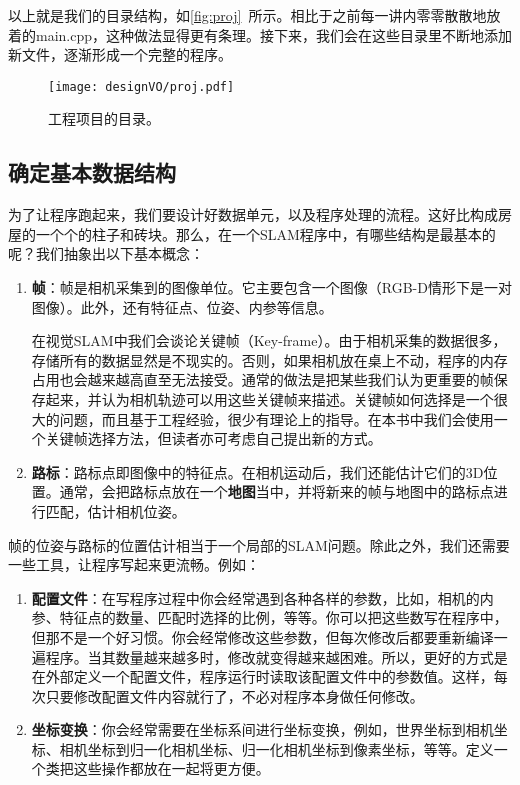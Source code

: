 以上就是我们的目录结构，如\autoref{fig:proj}~所示。相比于之前每一讲内零零散散地放着的main.cpp，这种做法显得更有条理。接下来，我们会在这些目录里不断地添加新文件，逐渐形成一个完整的程序。

\begin{figure}[!htp]
	\centering
	\texttt{[image: designVO/proj.pdf]}
	\caption{工程项目的目录。}
	\label{fig:proj}
\end{figure}

\subsection{确定基本数据结构}
为了让程序跑起来，我们要设计好数据单元，以及程序处理的流程。这好比构成房屋的一个个的柱子和砖块。那么，在一个SLAM程序中，有哪些结构是最基本的呢？我们抽象出以下基本概念：

\begin{enumerate}
	\item \textbf{帧}：帧是相机采集到的图像单位。它主要包含一个图像（RGB-D情形下是一对图像）。此外，还有特征点、位姿、内参等信息。
	
	在视觉SLAM中我们会谈论关键帧（Key-frame）。由于相机采集的数据很多，存储所有的数据显然是不现实的。否则，如果相机放在桌上不动，程序的内存占用也会越来越高直至无法接受。通常的做法是把某些我们认为更重要的帧保存起来，并认为相机轨迹可以用这些关键帧来描述。关键帧如何选择是一个很大的问题，而且基于工程经验，很少有理论上的指导。在本书中我们会使用一个关键帧选择方法，但读者亦可考虑自己提出新的方式。
	
	\item \textbf{路标}：路标点即图像中的特征点。在相机运动后，我们还能估计它们的3D位置。通常，会把路标点放在一个\textbf{地图}当中，并将新来的帧与地图中的路标点进行匹配，估计相机位姿。
\end{enumerate}

\clearpage
帧的位姿与路标的位置估计相当于一个局部的SLAM问题。除此之外，我们还需要一些工具，让程序写起来更流畅。例如：

\begin{enumerate}
	\item \textbf{配置文件}：在写程序过程中你会经常遇到各种各样的参数，比如，相机的内参、特征点的数量、匹配时选择的比例，等等。你可以把这些数写在程序中，但那不是一个好习惯。你会经常修改这些参数，但每次修改后都要重新编译一遍程序。当其数量越来越多时，修改就变得越来越困难。所以，更好的方式是在外部定义一个配置文件，程序运行时读取该配置文件中的参数值。这样，每次只要修改配置文件内容就行了，不必对程序本身做任何修改。
	\item \textbf{坐标变换}：你会经常需要在坐标系间进行坐标变换，例如，世界坐标到相机坐标、相机坐标到归一化相机坐标、归一化相机坐标到像素坐标，等等。定义一个类把这些操作都放在一起将更方便。
\end{enumerate}

